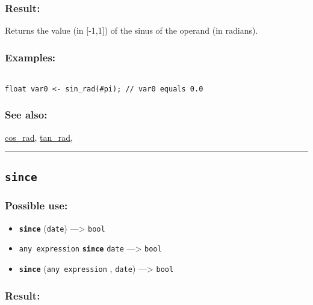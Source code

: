 \documentclass[]{book}
\providecommand{\tightlist}{%
  \setlength{\itemsep}{0pt}\setlength{\parskip}{0pt}}
\theoremstyle{definition}
\theoremstyle{definition}
\theoremstyle{definition}
\theoremstyle{remark}
\begin{document}
\subsubsection{Result:}\label{result-461}

Returns the value (in {[}-1,1{]}) of the sinus of the operand (in
radians).

\subsubsection{Examples:}\label{examples-333}

\begin{verbatim}
 
float var0 <- sin_rad(#pi); // var0 equals 0.0
\end{verbatim}

\subsubsection{See also:}\label{see-also-186}

\href{OperatorsBC\#cos_rad}{cos\_rad},
\href{OperatorsSZ\#tan_rad}{tan\_rad},

\begin{center}\rule{0.5\linewidth}{\linethickness}\end{center}

\subsection{\texorpdfstring{\texttt{since}}{since}}\label{since}

\subsubsection{Possible use:}\label{possible-use-478}

\begin{itemize}
\tightlist
\item
  \textbf{\texttt{since}} (\texttt{date}) ---\textgreater{}
  \texttt{bool}
\item
  \texttt{any\ expression} \textbf{\texttt{since}} \texttt{date}
  ---\textgreater{} \texttt{bool}
\item
  \textbf{\texttt{since}} (\texttt{any\ expression} , \texttt{date})
  ---\textgreater{} \texttt{bool}
\end{itemize}

\subsubsection{Result:}\label{result-462}
\end{document}
